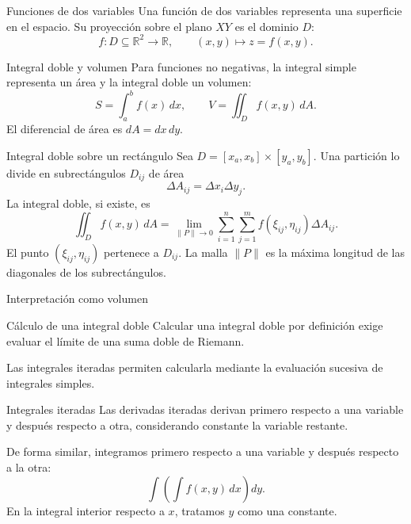 \documentclass[original_version/main.tex]{subfiles}
\begin{document}
\graphicspath{{imagenes/tema5/}{../imagenes/tema5/}}



\begin{frame}{Funciones de dos variables}
Una función de dos variables representa una superficie en el espacio. Su proyección sobre el plano $XY$ es el dominio $D$:\[f:D\subseteq\mathbb R^2\longrightarrow\mathbb R,\qquad(x,y)\longmapsto z=f(x,y).\]
\end{frame}

\begin{frame}{Integral doble y volumen}
\small Para funciones no negativas, la integral simple representa un área y la integral doble un volumen:\[S=\int_a^bf(x)\,dx,\qquad V=\iint_Df(x,y)\,dA.\]El diferencial de área es $dA=dx\,dy$.
\end{frame}

\begin{frame}{Integral doble sobre un rectángulo}
\small Sea $D=[x_a,x_b]\times[y_a,y_b]$. Una partición lo divide en subrectángulos $D_{ij}$ de área\[\Delta A_{ij}=\Delta x_i\Delta y_j.\]La integral doble, si existe, es\[\boxed{\iint_Df(x,y)\,dA=\lim_{\|P\|\to0}\sum_{i=1}^n\sum_{j=1}^m f(\xi_{ij},\eta_{ij})\Delta A_{ij}.}\]El punto $(\xi_{ij},\eta_{ij})$ pertenece a $D_{ij}$. La malla $\|P\|$ es la máxima longitud de las diagonales de los subrectángulos.
\end{frame}

\begin{frame}{Interpretación como volumen}
\end{frame}

\begin{frame}{Cálculo de una integral doble}
Calcular una integral doble por definición exige evaluar el límite de una suma doble de Riemann.\par\medskip Las \alert{integrales iteradas} permiten calcularla mediante la evaluación sucesiva de integrales simples.
\end{frame}

\begin{frame}{Integrales iteradas}
Las derivadas iteradas derivan primero respecto a una variable y después respecto a otra, considerando constante la variable restante.\par\medskip De forma similar, integramos primero respecto a una variable y después respecto a la otra:\[\int\!\left(\int f(x,y)\,dx\right)dy.\]En la integral interior respecto a $x$, tratamos $y$ como una constante.
\end{frame}
\end{document}

